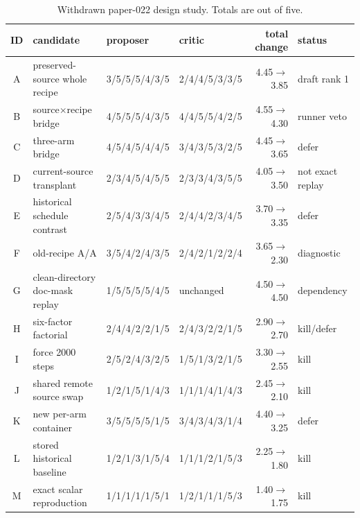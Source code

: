 \documentclass{article}
\begin{document}
\begin{table}[!ht]
\caption{Withdrawn paper-022 design study.  Totals are out of five.}
\label{tab:withdrawn}
\centering\tiny
\begin{tabular}{clllrl}
\toprule
ID & candidate & proposer & critic & total change & status\\
\midrule
A & preserved-source whole recipe & 3/5/5/5/4/3/5 & 2/4/4/5/3/3/5 & 4.45$\to$3.85 & draft rank 1\\
B & source$\times$recipe bridge & 4/5/5/5/4/3/5 & 4/4/5/5/4/2/5 & 4.55$\to$4.30 & runner veto\\
C & three-arm bridge & 4/5/4/5/4/4/5 & 3/4/3/5/3/2/5 & 4.45$\to$3.65 & defer\\
D & current-source transplant & 2/3/4/5/4/5/5 & 2/3/3/4/3/5/5 & 4.05$\to$3.50 & not exact replay\\
E & historical schedule contrast & 2/5/4/3/3/4/5 & 2/4/4/2/3/4/5 & 3.70$\to$3.35 & defer\\
F & old-recipe A/A & 3/5/4/2/4/3/5 & 2/4/2/1/2/2/4 & 3.65$\to$2.30 & diagnostic\\
G & clean-directory doc-mask replay & 1/5/5/5/5/4/5 & unchanged & 4.50$\to$4.50 & dependency\\
H & six-factor factorial & 2/4/4/2/2/1/5 & 2/4/3/2/2/1/5 & 2.90$\to$2.70 & kill/defer\\
I & force 2000 steps & 2/5/2/4/3/2/5 & 1/5/1/3/2/1/5 & 3.30$\to$2.55 & kill\\
J & shared remote source swap & 1/2/1/5/1/4/3 & 1/1/1/4/1/4/3 & 2.45$\to$2.10 & kill\\
K & new per-arm container & 3/5/5/5/5/1/5 & 3/4/3/4/3/1/4 & 4.40$\to$3.25 & defer\\
L & stored historical baseline & 1/2/1/3/1/5/4 & 1/1/1/2/1/5/3 & 2.25$\to$1.80 & kill\\
M & exact scalar reproduction & 1/1/1/1/1/5/1 & 1/2/1/1/1/5/3 & 1.40$\to$1.75 & kill\\
\bottomrule
\end{tabular}
\end{table}
\end{document}
